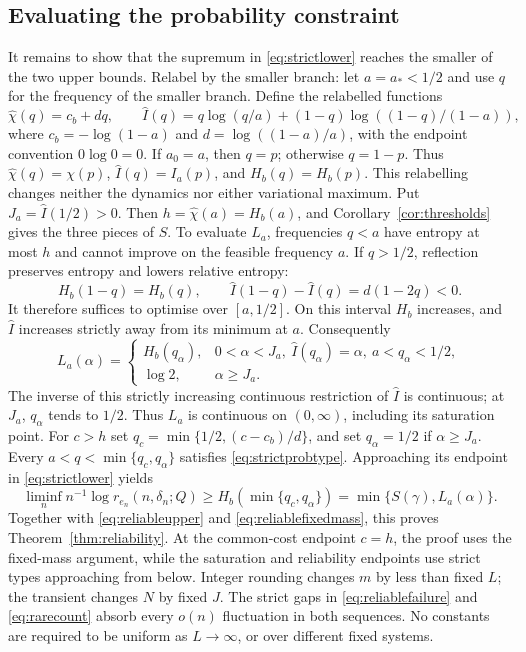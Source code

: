 \documentclass[11pt]{amsart}
\theoremstyle{definition}
\theoremstyle{remark}
\numberwithin{equation}{section}
\begin{document}
\subsection{Evaluating the probability constraint}
It remains to show that the supremum in \eqref{eq:strictlower}
reaches the smaller of the two upper bounds. Relabel by the smaller
branch: let $a=a_*<1/2$ and use $q$ for
the frequency of the smaller branch. Define the relabelled functions
\[
\widehat\chi(q)=c_b+dq,\qquad
\widehat I(q)=q\log(q/a)+(1-q)\log((1-q)/(1-a)),
\]
where $c_b=-\log(1-a)$ and $d=\log((1-a)/a)$, with the
endpoint convention $0\log0=0$. If $a_0=a$, then $q=p$;
otherwise $q=1-p$. Thus
$\widehat\chi(q)=\chi(p)$, $\widehat I(q)=I_a(p)$, and
$H_b(q)=H_b(p)$. This relabelling changes neither the dynamics
nor either variational maximum. Put $J_a=\widehat I(1/2)>0$.
Then $h=\widehat\chi(a)=H_b(a)$, and
Corollary~\ref{cor:thresholds} gives the three pieces of $S$.
To evaluate $L_a$, frequencies $q<a$ have entropy at most $h$
and cannot improve on the feasible frequency $a$. If $q>1/2$,
reflection preserves entropy and lowers relative entropy:
\[
H_b(1-q)=H_b(q),\qquad
\widehat I(1-q)-\widehat I(q)=d(1-2q)<0.
\]
It therefore suffices to optimise over $[a,1/2]$. On this interval
$H_b$ increases, and $\widehat I$ increases strictly away from
its minimum at $a$. Consequently
\begin{equation}\label{eq:reliabilityclosed}
L_a(\alpha)=
\begin{cases}
H_b(q_\alpha),&0<\alpha<J_a,\ \widehat I(q_\alpha)=\alpha,
                                      \ a<q_\alpha<1/2,\\
\log2,&\alpha\ge J_a.
\end{cases}
\end{equation}
The inverse of this strictly increasing continuous restriction of
$\widehat I$ is continuous; at $J_a$, $q_\alpha$ tends to $1/2$.
Thus $L_a$ is continuous on $(0,\infty)$, including its saturation
point.
For $c>h$ set $q_c=\min\{1/2,(c-c_b)/d\}$, and set
$q_\alpha=1/2$ if $\alpha\ge J_a$.
Every $a<q<\min\{q_c,q_\alpha\}$ satisfies
\eqref{eq:strictprobtype}. Approaching its endpoint in
\eqref{eq:strictlower} yields
\[
\liminf_n n^{-1}\log r_{e_n}(n,\delta_n;Q)
 \ge H_b(\min\{q_c,q_\alpha\})
 =\min\{S(\gamma),L_a(\alpha)\}.
\]
Together with \eqref{eq:reliableupper} and
\eqref{eq:reliablefixedmass}, this proves
Theorem~\ref{thm:reliability}. At the common-cost endpoint $c=h$, the proof
uses the fixed-mass argument, while the saturation and reliability
endpoints use strict types approaching from below. Integer rounding
changes $m$ by less than fixed $L$; the transient changes $N$ by
fixed $J$. The strict gaps in \eqref{eq:reliablefailure} and
\eqref{eq:rarecount} absorb every $o(n)$ fluctuation in both
sequences. No constants are required to be uniform as $L\to\infty$,
or over different fixed systems.
\end{document}
